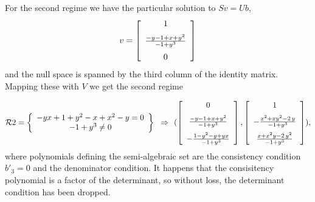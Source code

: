 For the second regime we have the particular solution to $Sv = Ub$,  
\[v = 
\left [\begin {array}{c} 1\\\noalign{\medskip}
\frac {-y-1+x+y^2}{-1+{y}^{3}}\\\noalign{\medskip}
0\end {array}\right ]
\]
and the null space is spanned by the third column of the identity matrix.
Mapping these with $V$ we get the second regime


%
%
\[ \RR2 = 
\breg -yx+1+{y}^{2}-x+{x}^{2}-y=0\\
-1+{y}^{3}\neq 0 \ereg \implies
(\left [\begin {array}{c} 0\\\noalign{\medskip}{\frac {-y-1+x+{y}^{2}}{-
1+{y}^{3}}}\\\noalign{\medskip}-{\frac {1-{y}^{2}-y+yx}{-1+{y}^{3}}}
\end {array}\right ],
\left [\begin {array}{c} 1\\\noalign{\medskip}-{\frac {{x}^{2}+x{y}^{2}
-2\,y}{-1+{y}^{3}}}\\\noalign{\medskip}{\frac {x+{x}^{2}y-2\,{y}^{2}}{-
1+{y}^{3}}}\end {array}\right ]
),
\]
where polynomials defining the semi-algebraic set are the consistency
condition $b'_3 = 0$ and the denominator condition.
It happens that the consisitency polynomial is a factor of the determinant, so without
loss, the determinant condition has been dropped.


